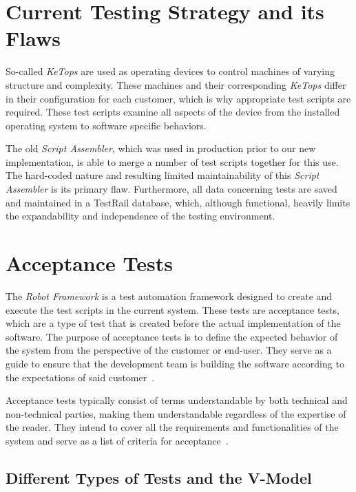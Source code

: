 
\section{Current Testing Strategy and its Flaws}

So-called \textit{KeTops} are used as operating devices to control machines of varying structure and complexity. These machines and their corresponding \textit{KeTops} differ in their configuration for each customer, which is why appropriate test scripts are required. These test scripts examine all aspects of the device from the installed operating system to software specific behaviors. 

The old \textit{Script Assembler}, which was used in production prior to our new implementation, is able to merge a number of test scripts together for this use. The hard-coded nature and resulting limited maintainability of this \textit{Script Assembler} is its primary flaw. Furthermore, all data concerning tests are saved and maintained in a TestRail database, which, although functional, heavily limits the expandability and independence of the testing environment.

\section{Acceptance Tests}

The \textit{Robot Framework} is a test automation framework designed to create and execute the test scripts in the current system. These tests are acceptance tests, which are a type of test that is created before the actual implementation of the software. The purpose of acceptance tests is to define the expected behavior of the system from the perspective of the customer or end-user. They serve as a guide to ensure that the development team is building the software according to the expectations of said customer~\cite{WikiRobotFramework}.

Acceptance tests typically consist of terms understandable by both technical and non-technical parties, making them understandable regardless of the expertise of the reader. They intend to cover all the requirements and functionalities of the system and serve as a list of criteria for acceptance~\cite{WikiAcceptanceTestDrivenDev}.

\subsection{Different Types of Tests and the V-Model}

